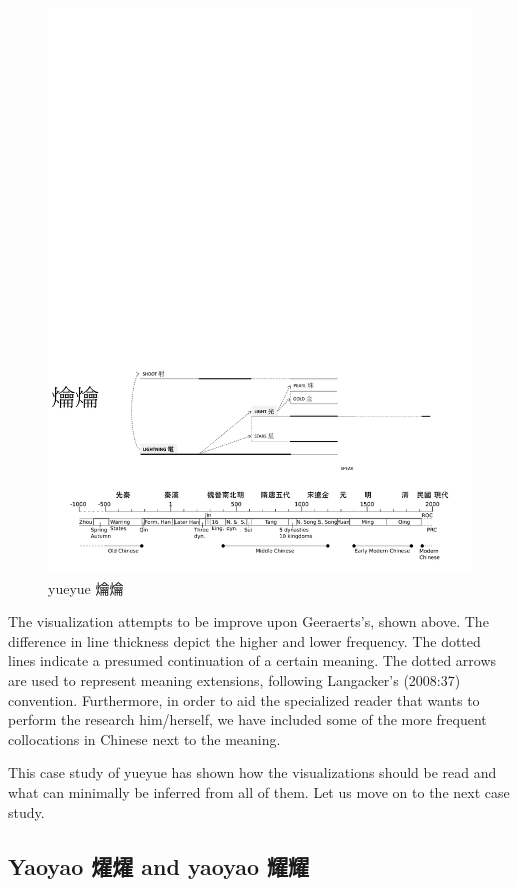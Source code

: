 \begin{figure}
\centering
\includegraphics{ideos/yueyue.pdf}
\caption{\label{fig:yueyue}yueyue 爚爚}
\end{figure}

The visualization attempts to be improve upon Geeraerts's, shown above.
The difference in line thickness depict the higher and lower frequency.
The dotted lines indicate a presumed continuation of a certain meaning.
The dotted arrows are used to represent meaning extensions, following
Langacker's (2008:37) convention. Furthermore, in order to aid the
specialized reader that wants to perform the research him/herself, we
have included some of the more frequent collocations in Chinese next to
the meaning.

This case study of yueyue has shown how the visualizations should be
read and what can minimally be inferred from all of them. Let us move on
to the next case study.

\subsection{Yaoyao 燿燿 and yaoyao 耀耀}\label{yaoyao--and-yaoyao-}

